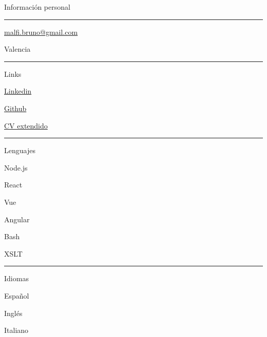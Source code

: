 \documentclass{letter}
\begin{document}
\begin{minipage}[t]{0.40\textwidth}
\setlength{\baselineskip}{1.5\baselineskip}
\color{white}
\vspace{1cm}
{\large Información personal}

\rule{\linewidth}{0.4pt}

\faPhone \quad  

\faEnvelope \quad \href{malfi.bruno@gmail.com}{malfi.bruno@gmail.com}


\faMapMarker \quad Valencia

\rule{\linewidth}{0.4pt}

{\large Links}

\faLinkedin \quad \href{https://www.linkedin.com/in/bruno-malfi-fabeiro}{Linkedin}

\faGithub \quad \href{https://github.com/BrunoMalfi}{Github}

\faPaperclip \quad \href{https://github.com/BrunoMalfi}{CV extendido}

\rule{\linewidth}{0.4pt}

{\large Lenguajes}

\faNode \quad Node.js

\faReact \quad React

\faVuejs \quad Vue

\faAngular \quad Angular

\faLinux \quad Bash

\faCircleNotch \quad XSLT


\rule{\linewidth}{0.4pt}

{\large Idiomas}

\faLanguage \quad Español

\faLanguage \quad Inglés

\faLanguage \quad Italiano

\end{minipage}
\hfill
\end{document}
